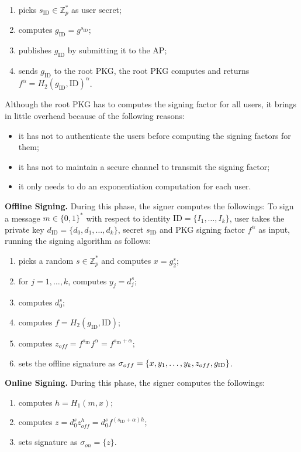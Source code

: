 \documentclass[times]{secauth}
\theoremstyle{definition}
\theoremstyle{remark}
\begin{document}
\begin{enumerate}
\item picks $s_{\mathrm{ID}} \in \mathbb{Z}_p^*$ as user secret;
\item computes $g_{\mathrm{ID}} = g^{s_{\mathrm{ID}}}$;
\item publishes $g_{\mathrm{ID}}$ by submitting it to the AP;
\item sends $g_{\mathrm{ID}}$ to the root PKG, the root PKG computes and returns $f^\alpha = H_2(g_\mathrm{ID}, \mathrm{ID})^\alpha$. 
\end{enumerate}
Although the root PKG has to computes the signing factor for all users, it brings in little overhead because of the following reasons:
\begin{itemize}
\item it has not to authenticate the users before computing the signing factors for them;
\item it has not to maintain a secure channel to transmit the signing factor;
\item it only needs to do an exponentiation computation for each user.
\end{itemize}
\textbf{Offline Signing.} 
During this phase, the signer computes the followings:
To sign a message $m \in \{0, 1\}^*$ with respect to identity $\mathrm{ID} = \{I_1, \ldots, I_k\}$, user takes the private key $d_{\mathrm{ID}} = \{d_0, d_1, \ldots, d_k\}$, secret $s_{\mathrm{ID}}$ and PKG signing factor $f^\alpha$ as input, running the signing algorithm as follows:
\begin{enumerate}
\item picks a random $s \in \mathbb{Z}_p^*$ and computes $x = g_2^s$;
\item for $j = 1, \ldots, k$, computes $y_j = d_j^{s}$;
\item computes $d_0^{s}$;
\item computes $f = H_2(g_\mathrm{ID}, \mathrm{ID})$;
\item computes $z_{off} = f^{s_\mathrm{ID}} f^\alpha = f^{s_\mathrm{ID} + \alpha}$;
\item sets the offline signature as $\sigma_{off} = \{x, y_1, \ldots, y_k, \\z_{off}, g_{\mathrm{ID}}\}$.
\end{enumerate}
\textbf{Online Signing.}
During this phase, the signer computes the followings:
\begin{enumerate}
\item computes  $h = H_1(m, x)$;
\item computes $z = d_0^{s} z_{off}^h =  d_0^sf^{(s_\mathrm{ID} + \alpha)h}$;
\item sets signature as $\sigma_{on} = \{z\}$.
\end{enumerate}
\end{document}
